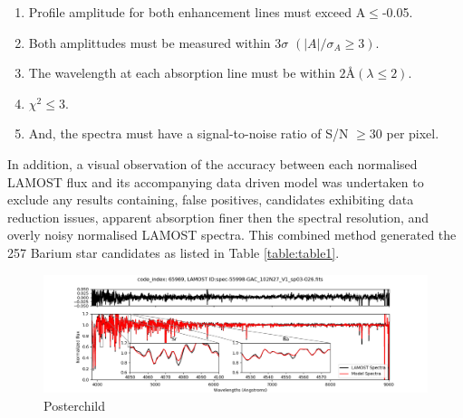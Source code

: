 \documentclass[a4paper,fleqn,usenatbib]{mnras}
\begin{document}
\renewcommand\labelenumi{(\roman{enumi})}
\renewcommand\theenumi\labelenumi

\begin{enumerate} 
\item Profile amplitude for both enhancement lines must exceed A$\leq$-0.05.
\item Both amplittudes must be measured within 3$\sigma$ $(|A|/\sigma _A \geq 3)$.
\item The wavelength at each absorption line must be within $2$\AA \hspace{0.2mm}$(\lambda \leq 2)$.
\item $\chi^2 \leq 3$.
\item And, the spectra must have a signal-to-noise ratio of S/N $\geq 30$ per pixel.
\end{enumerate}
In addition, a visual observation of the accuracy between each normalised LAMOST flux and its accompanying data driven model was undertaken to exclude any results containing, false positives, candidates exhibiting data reduction issues, apparent absorption finer then the spectral resolution, and overly noisy normalised LAMOST spectra. This combined method generated the 257 Barium star candidates as listed in Table \ref{table:table1}. 

\begin{figure}
	\includegraphics[width=\columnwidth]{posterchild.png}
    \caption{Posterchild}
    \label{fig:figure1}
\end{figure}
\end{document}
